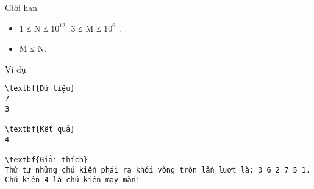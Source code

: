Giới hạn  
\begin{itemize}
	\item     1 ≤ N ≤ $10^{12}$    .3 ≤ M ≤ $10^{6}$    .   
	\item     M ≤ N.   
\end{itemize}
   Ví dụ  
\begin{verbatim}
\textbf{Dữ liệu}
7 
3

\textbf{Kết quả}
4

\textbf{Giải thích}
Thứ tự những chú kiến phải ra khỏi vòng tròn lần lượt là: 3 6 2 7 5 1.
Chú kiến 4 là chú kiến may mắn!
\end{verbatim}